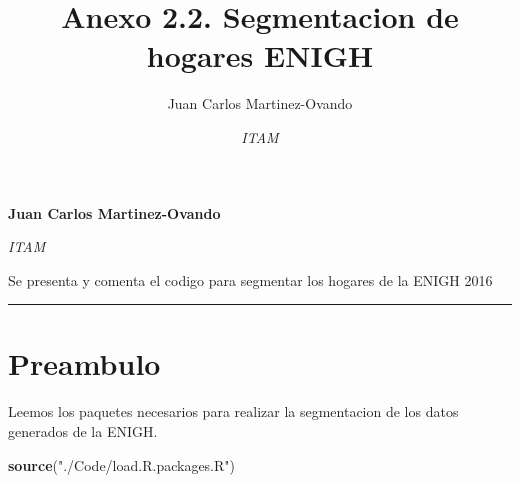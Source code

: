\documentclass[11pt,]{article}
\title{Anexo 2.2. Segmentacion de hogares ENIGH  }
\author{\Large Juan Carlos Martinez-Ovando\vspace{0.05in} \newline\normalsize\emph{}   \and \Large \vspace{0.05in} \newline\normalsize\emph{ITAM}  }
\date{}
\newcommand*{\authorfont}{\fontfamily{phv}\selectfont}
\renewenvironment{abstract}
 {{%
    \setlength{\leftmargin}{0mm}
    \setlength{\rightmargin}{\leftmargin}%
  }%
  \relax}
 {\endlist}
\newenvironment{Shaded}{\begin{snugshade}}{\end{snugshade}}
\newcommand{\KeywordTok}[1]{\textcolor[rgb]{0.13,0.29,0.53}{\textbf{#1}}}
\newcommand{\StringTok}[1]{\textcolor[rgb]{0.31,0.60,0.02}{#1}}
\newcommand{\NormalTok}[1]{#1}
\begin{document}
	
%

{%
\setlength{\parindent}{0pt}
\thispagestyle{plain}
{\fontsize{18}{20}\selectfont\raggedright 
\maketitle  %

}

{
   \vskip 13.5pt\relax \normalsize\fontsize{11}{12} 
\textbf{\authorfont Juan Carlos Martinez-Ovando} \hskip 15pt \emph{\small }   \par \textbf{\authorfont } \hskip 15pt \emph{\small ITAM}   

}

}








\begin{abstract}

    \hbox{\vrule height .2pt width 39.14pc}

    \vskip 8.5pt %

\noindent Se presenta y comenta el codigo para segmentar los hogares de la ENIGH
2016


    \hbox{\vrule height .2pt width 39.14pc}


\end{abstract}


\vskip 6.5pt


\noindent  \begin{center}\rule{0.5\linewidth}{\linethickness}\end{center}

\section{Preambulo}\label{preambulo}

Leemos los paquetes necesarios para realizar la segmentacion de los
datos generados de la ENIGH.

\begin{Shaded}
\begin{Highlighting}[]
\KeywordTok{source}\NormalTok{(}\StringTok{"./Code/load.R.packages.R"}\NormalTok{)}
\end{Highlighting}
\end{Shaded}
\end{document}
